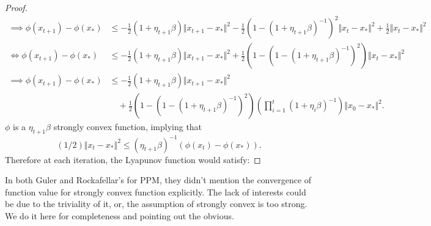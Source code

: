 \documentclass[12pt]{article}
\begin{document}
\begin{proof}
{\begin{align*}
                \implies 
                \phi(x_{t + 1}) - \phi(x_*)
                &\le 
                -\frac{1}{2}(1 + \eta_{t + 1}\beta)\Vert x_{t + 1} - x_*\Vert^2
                - \frac{1}{2}(1 - (1 + \eta_{t + 1}\beta)^{-1})^2\Vert x_t - x_*\Vert^2
                + \frac{1}{2}\Vert x_t - x_*\Vert^2
                \\
                \iff
                \phi(x_{t + 1}) - \phi(x_*)
                &\le 
                -\frac{1}{2}(1 + \eta_{t + 1}\beta)\Vert x_{t + 1} - x_*\Vert^2
                + \frac{1}{2}\left(
                    1 - (1 - (1 + \eta_{t + 1}\beta)^{-1})^2
                \right)
                \Vert x_t - x_*\Vert^2
                \\
                \implies
                \phi(x_{t + 1}) - \phi(x_*)
                &\le 
                -\frac{1}{2}(1 + \eta_{t + 1}\beta)\Vert x_{t + 1} - x_*\Vert^2
                \\
                & \quad 
                + \frac{1}{2}\left(
                    1 - (1 - (1 + \eta_{t + 1}\beta)^{-1})^2
                \right)
                \left(
                    \prod_{i = 1}^{t}
                        (1 + \eta_i \beta)^{-1}
                \right)\Vert x_0 - x_*\Vert^2. 
            \end{align*}
            }
            $\phi$ is a $\eta_{t + 1}\beta$ strongly convex function, implying that 
            $$
                (1/2)\Vert x_{t} - x_*\Vert^2 \le (\eta_{t + 1}\beta)^{-1}(\phi(x_t) - \phi(x_*)). 
            $$
            Therefore at each iteration, the Lyapunov function would satisfy: 


        \end{proof}
        \begin{remark}
            In both Guler\cite{guler_convergence_1991} and Rockafellar's \cite{rockafellar_monotone_1976} for PPM, they didn't mention the convergence of function value for strongly convex function explicitly. 
            The lack of interests could be due to the triviality of it, or, the assumption of strongly convex is too strong. 
            We do it here for completeness and pointing out the obvious.

        \end{remark}
        
\end{document}
